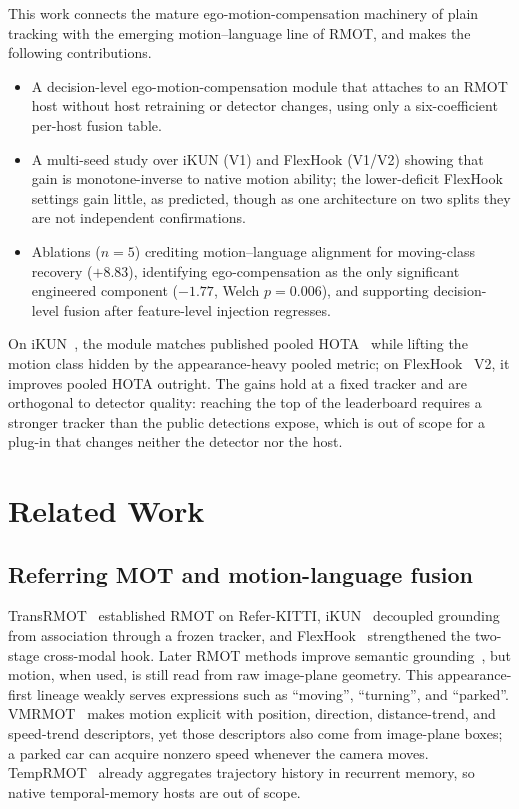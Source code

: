 \documentclass[sigconf,review,anonymous]{acmart}
\begin{document}
This work connects the mature ego-motion-compensation machinery of plain tracking with the emerging motion--language line of RMOT, and makes the following contributions.
\begin{itemize}
  \item A decision-level ego-motion-compensation module that attaches to an RMOT host without host retraining or detector changes, using only a six-coefficient per-host fusion table.
  \item A multi-seed study over iKUN (V1) and FlexHook (V1/V2) showing that gain is monotone-inverse to native motion ability; the lower-deficit FlexHook settings gain little, as predicted, though as one architecture on two splits they are not independent confirmations.
  \item Ablations ($n{=}5$) crediting motion--language alignment for moving-class recovery ($+8.83$), identifying ego-compensation as the only significant engineered component ($-1.77$, Welch $p{=}0.006$), and supporting decision-level fusion after feature-level injection regresses.
\end{itemize}

On iKUN~\cite{ikun}, the module matches published pooled HOTA~\cite{hota} while lifting the motion class hidden by the appearance-heavy pooled metric; on FlexHook~\cite{flexhook} V2, it improves pooled HOTA outright. The gains hold at a fixed tracker and are orthogonal to detector quality: reaching the top of the leaderboard requires a stronger tracker than the public detections expose, which is out of scope for a plug-in that changes neither the detector nor the host.

\section{Related Work}
\label{sec:related}

\subsection{Referring MOT and motion-language fusion}
TransRMOT~\cite{transrmot} established RMOT on Refer-KITTI, iKUN~\cite{ikun} decoupled grounding from association through a frozen tracker, and FlexHook~\cite{flexhook} strengthened the two-stage cross-modal hook. Later RMOT methods improve semantic grounding~\cite{mlstrack,deeprmot,cdrmot,tellmewhat}, but motion, when used, is still read from raw image-plane geometry. This appearance-first lineage weakly serves expressions such as ``moving'', ``turning'', and ``parked''. VMRMOT~\cite{vmrmot} makes motion explicit with position, direction, distance-trend, and speed-trend descriptors, yet those descriptors also come from image-plane boxes; a parked car can acquire nonzero speed whenever the camera moves. TempRMOT~\cite{temprmot} already aggregates trajectory history in recurrent memory, so native temporal-memory hosts are out of scope.
\end{document}
